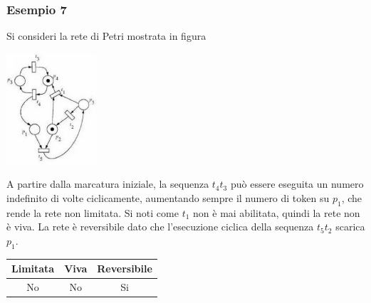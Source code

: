 \documentclass[10pt, letterpaper]{report}
\begin{document}
\subsubsection{Esempio 7}
Si consideri la rete di Petri mostrata in figura
\begin{center}
    \includegraphics[width=0.25\textwidth]{images/PetriEs7.png}
\end{center}
A partire dalla marcatura iniziale, la sequenza $t_4t_3$ può essere eseguita un numero indefinito di volte ciclicamente, aumentando sempre il numero di token su $p_1$, che rende la rete non limitata. Si noti come $t_1$ non è mai abilitata, quindi la rete non è viva. La rete è reversibile dato che l'esecuzione ciclica della sequenza $t_5t_2$ scarica $p_1$.
\begin{center}
    \begin{tabular}{|c|c|c|}
        \hline
        \rowcolor[HTML]{EFEFEF} 
        Limitata & Viva & Reversibile \\ \hline
        No       & No   & Si          \\ \hline
        \end{tabular}
\end{center}
\end{document}
